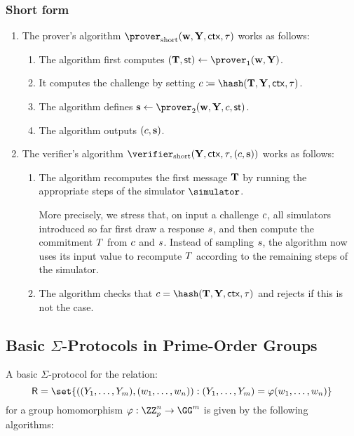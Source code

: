 \documentclass[runningheads,11pt]{article}
\begin{document}
\subsubsection{Short form}
\begin{enumerate}
  \item
    The prover's algorithm $\shortprover(\vec \witness, \vec \statement,\ctx, \stag)$ works as follows:
    \begin{enumerate}
      \item
        The algorithm first computes $(\vec \commitment,\st)\gets\prover_1(\vec \witness, \vec \statement)$.
      \item
        It computes the challenge by setting $c\defeq\hash(\vec \commitment, \vec \statement,\ctx, \stag)$.
      \item
        The algorithm defines $\vec \response\gets\prover_2(\vec \witness,\vec \statement, \challenge,\st)$.
      \item
        The algorithm outputs $(c,\mathbf {s})$.
    \end{enumerate}
  \item
    The verifier's algorithm $\shortverifier(\vec \statement, \ctx, \stag, (\challenge, \vec \response))$ works as follows:
    \begin{enumerate}
      \item\label{item:fslong:v:recomputet}
        The algorithm recomputes the first message $\mathbf {T}$ by running the appropriate steps of the simulator $\simulator$.

         More precisely, we stress that, on input a challenge $c$, all simulators introduced so far first draw a response $s$, and then compute the commitment $T$ from $c$ and $s$.
        Instead of sampling $s$, the algorithm now uses its input value to recompute $T$ according to the remaining steps of the simulator.
        \item
        The algorithm checks that $c=\hash(\vec \commitment, \vec \statement, \ctx, \tau)$ and rejects if this is not the case.
    \end{enumerate}
\end{enumerate}



\subsection{Basic $\Sigma$-Protocols in Prime-Order Groups}\label{sec:basicsigma}
A basic $\Sigma$-protocol for the relation:
\[
  \relation=\set{((\statement_1,\dots,\statement_m),(w_1,\dots,w_n)) : (\statement_1,\dots,\statement_m)=\varphi(w_1,\dots,w_n)}
\]
 for a group homomorphism $\varphi:\ZZ_p^n\to\GG^m$ is given by the following algorithms:
\end{document}
